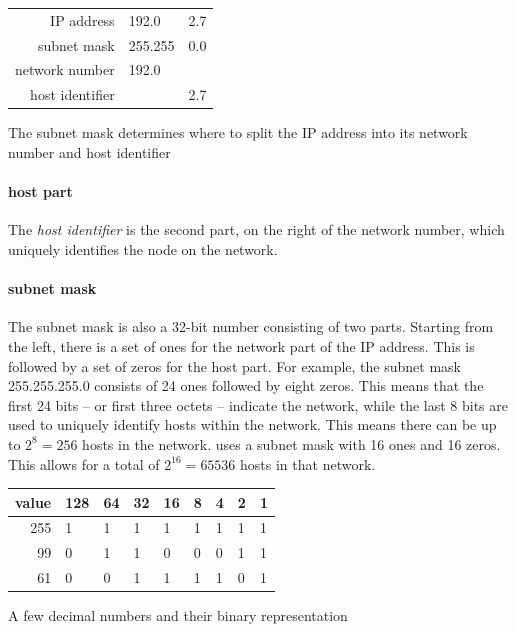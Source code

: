 \begin{margintable}
\footnotesize
\begin{tabular}{@{}rl@{.}r@{}}
\textcolor{spot5}{\acs{IP} address} & \textcolor{spot1}{192.0} & \textcolor{spot2}{2.7} \\
\textcolor{spot5}{subnet mask}      & 255.255                  & 0.0                    \\
\textcolor{spot5}{network number}   & \textcolor{spot1}{192.0} &                        \\
\textcolor{spot5}{host identifier}  &                          & \textcolor{spot2}{2.7} \\
\end{tabular}
\caption{The subnet mask determines where to split the \acs{IP} address into its network number and host identifier}
\label{tab:network-host-part}
\end{margintable}

\paragraph{host part}
The \emph{host identifier}%
is the second part, on the right of the network number, which uniquely identifies the node on the network.

\paragraph{subnet mask}
The subnet mask is also a 32-bit number consisting of two parts.
Starting from the left, there is a set of ones for the network part of the \acs{IP} address.
This is followed by a set of zeros for the host part.
For example, the subnet mask 255.255.255.0 consists of 24 ones followed by eight zeros.
This means that the first 24 bits -- or first three octets -- indicate the network, while the last 8 bits are used to uniquely identify hosts within the network.
This means there can be up to $2^8=256$ hosts in the network.
 uses a subnet mask with 16 ones and 16 zeros.
This allows for a total of $2^{16}=65536$ hosts in that network.

\begin{margintable}
\footnotesize
\begin{tabular}{
   @{}r
   p{5mm}@{ }
   p{4mm}@{ }
   p{4mm}@{ }
   p{4mm}@{ }
   p{3mm}@{ }
   p{3mm}@{ }
   p{3mm}@{ }
   p{3mm}@{}
}
value & 128 & 64 & 32 & 16 & 8 & 4 & 2 & 1 \\
\midrule
  255 &   1 &  1 &  1 &  1 & 1 & 1 & 1 & 1 \\
   99 &   0 &  1 &  1 &  0 & 0 & 0 & 1 & 1 \\
   61 &   0 &  0 &  1 &  1 & 1 & 1 & 0 & 1 \\
\end{tabular}
\caption{A few decimal numbers and their binary representation}
\end{margintable}

